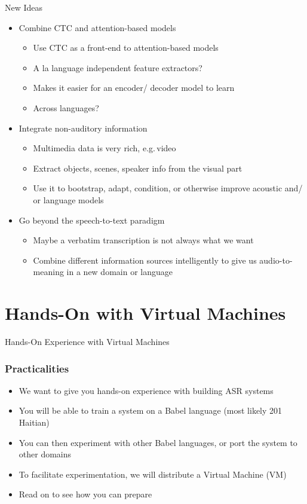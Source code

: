 \begin{frame}{New Ideas}
  \begin{itemize}
  \item Combine CTC and attention-based models
    \begin{itemize}
    \item Use CTC as a front-end to attention-based models
    \item A la language independent feature extractors?
    \item Makes it easier for an encoder/ decoder model to learn
    \item Across languages?
    \end{itemize}
  \item Integrate non-auditory information
    \begin{itemize}
    \item Multimedia data is very rich, e.g.\,video
    \item Extract objects, scenes, speaker info from the visual part
    \item Use it to bootstrap, adapt, condition, or otherwise improve acoustic and/ or language models
    \end{itemize}
  \item Go beyond the speech-to-text paradigm
    \begin{itemize}
    \item Maybe a verbatim transcription is not always what we want
    \item Combine different information sources intelligently to give us audio-to-meaning in a new domain or language
    \end{itemize}
  \end{itemize}
\end{frame}


\section{Hands-On with Virtual Machines}

\begin{frame}
  \begin{center}
    {\color{Maroon}\Huge Hands-On Experience with Virtual Machines\par}
  \end{center}
\end{frame}

\begin{frame}
  \frametitle{Practicalities}
  \begin{itemize}
  \item We want to give you hands-on experience with building ASR systems
  \item You will be able to train a system on a Babel language (most likely 201 Haitian)
  \item You can then experiment with other Babel languages, or port the system to other domains
  \item To facilitate experimentation, we will distribute a Virtual Machine (VM)
  \item {\color{Maroon}Read on to see how you can prepare}
  \end{itemize}
\end{frame}

